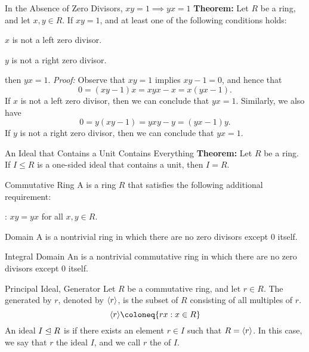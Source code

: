 \begin{thmbox}{In the Absence of Zero Divisors, $xy = 1 \implies yx = 1$}
	\textbf{Theorem:} Let $R$ be a ring, and let $x, y \in R$. If $xy = 1$, and at least one of the following conditions holds:
	\begin{dfnitems}
		\item $x$ is not a left zero divisor.
		\item $y$ is not a right zero divisor.
	\end{dfnitems}
	then $yx = 1$.
\tcblower
	\textit{Proof:} Observe that $xy = 1$ implies $xy - 1 = 0$, and hence that
	\[ 0 = (xy - 1)x = xyx - x = x(yx - 1). \]
	If $x$ is not a left zero divisor, then we can conclude that $yx = 1$. Similarly, we also have
	\[ 0 = y(xy - 1) = yxy - y = (yx - 1)y. \]
	If $y$ is not a right zero divisor, then we can conclude that $yx = 1$.
\end{thmbox}

\begin{thmbox}{An Ideal that Contains a Unit Contains Everything}
	\textbf{Theorem:} Let $R$ be a ring. If $I \le R$ is a one-sided ideal that contains a unit, then $I = R$.
\end{thmbox}

\begin{dfnbox}{Commutative Ring}
	A  is a ring $R$ that satisfies the following additional requirement:
	\begin{dfnitems}
		\item {}: $xy = yx$ for all $x, y \in R$.
	\end{dfnitems}
\end{dfnbox}

\begin{dfnbox}{Domain}
	A  is a nontrivial ring in which there are no zero divisors except $0$ itself.
\end{dfnbox}

\begin{dfnbox}{Integral Domain}
	An  is a nontrivial commutative ring in which there are no zero divisors except $0$ itself.
\end{dfnbox}

\begin{dfnbox}{Principal Ideal, Generator}
	Let $R$ be a commutative ring, and let $r \in R$. The  generated by $r$, denoted by ${\langle {r} \rangle}$, is the subset of $R$ consisting of all multiples of $r$.
	\[ \gen{r} \coloneq \{ rx : x \in R \} \]
	An ideal $I \trianglelefteq R$ is  if there exists an element $r \in I$ such that $R = {\langle {r} \rangle}$. In this case, we say that $r$  the ideal $I$, and we call $r$ the  of $I$.
\end{dfnbox}

